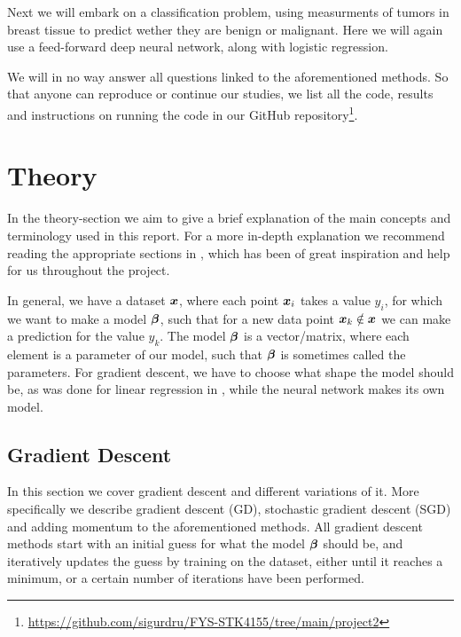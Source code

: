 \documentclass[12pt]{extarticle}
\begin{document}
Next we will embark on a classification problem, using measurments of tumors in breast tissue to predict wether they are benign or malignant. Here we will again use a feed-forward deep neural network, along with logistic regression.

We will in no way answer all questions linked to the aforementioned methods. So that anyone can reproduce or continue our studies, we list all the code, results and instructions on running the code in our GitHub repository\footnote{\href{https://github.com/sigurdru/FYS-STK4155/tree/main/project1}{https://github.com/sigurdru/FYS-STK4155/tree/main/project2}}.

\section{Theory}
In the theory-section we aim to give a brief explanation of the main concepts and terminology used in this report. For a more in-depth explanation we recommend reading the appropriate sections in \cite{2019}, which has been of great inspiration and help for us throughout the project.

In general, we have a dataset $\boldsymbol x$, where each point $\boldsymbol x_i$ takes a value $y_i$, for which we want to make a model $\boldsymbol{\beta}$, such that for a new data point $\boldsymbol x_k \notin \boldsymbol x$ we can make a prediction for the value $y_k$.  The model $\boldsymbol{\beta}$ is a vector/matrix, where each element is a parameter of our model, such that $\boldsymbol{\beta}$ is sometimes called the parameters. For gradient descent, we have to choose what shape the model should be, as was done for linear regression in \cite{project1}, while the neural network makes its own model.

\subsection{Gradient Descent}\label{sec:GD}
In this section we cover gradient descent and different variations of it. More specifically we describe gradient descent (GD), stochastic gradient descent (SGD) and adding momentum to the aforementioned methods. All gradient descent methods start with an initial guess for what the model $\boldsymbol{\beta}$ should be, and iteratively updates the guess by training on the dataset, either until it reaches a minimum, or a certain number of iterations have been performed.
\end{document}
